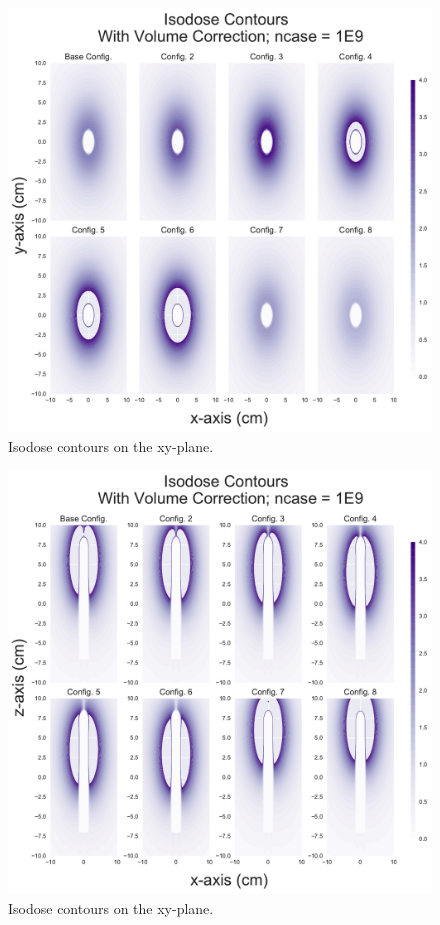 \documentclass[12pt]{article}
\begin{document}
\begin{figure}[!ht]
	\centering
	\includegraphics[scale=0.6]{xy_isodose_profiles_noShield}
	\caption{Isodose contours on the xy-plane.}
\end{figure}

\begin{figure}[!ht]
	\centering
	\includegraphics[scale=0.6]{xz_isodose_profiles_noShield}
	\caption{Isodose contours on the xy-plane.}
\end{figure}
\end{document}
